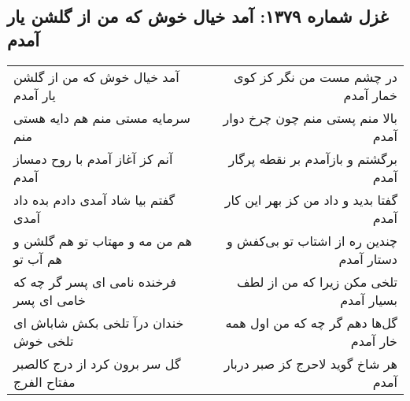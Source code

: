\begin{center}
\section*{غزل شماره ۱۳۷۹: آمد خیال خوش که من از گلشن یار آمدم}
\label{sec:1379}
\begin{longtable}{l p{0.5cm} r}
آمد خیال خوش که من از گلشن یار آمدم
&&
در چشم مست من نگر کز کوی خمار آمدم
\\
سرمایه مستی منم هم دایه هستی منم
&&
بالا منم پستی منم چون چرخ دوار آمدم
\\
آنم کز آغاز آمدم با روح دمساز آمدم
&&
برگشتم و بازآمدم بر نقطه پرگار آمدم
\\
گفتم بیا شاد آمدی دادم بده داد آمدی
&&
گفتا بدید و داد من کز بهر این کار آمدم
\\
هم من مه و مهتاب تو هم گلشن و هم آب تو
&&
چندین ره از اشتاب تو بی‌کفش و دستار آمدم
\\
فرخنده نامی ای پسر گر چه که خامی ای پسر
&&
تلخی مکن زیرا که من از لطف بسیار آمدم
\\
خندان درآ تلخی بکش شاباش ای تلخی خوش
&&
گل‌ها دهم گر چه که من اول همه خار آمدم
\\
گل سر برون کرد از درج کالصبر مفتاح الفرج
&&
هر شاخ گوید لاحرج کز صبر دربار آمدم
\\
\end{longtable}
\end{center}
